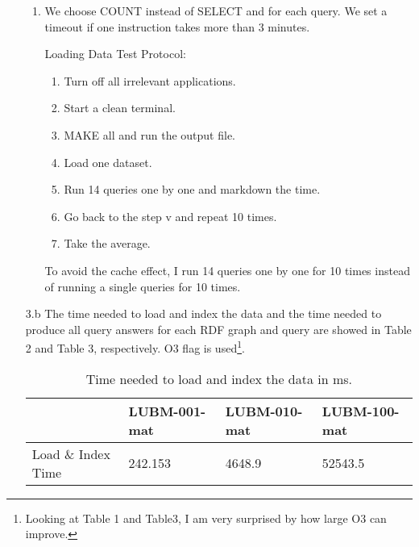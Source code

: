 \documentclass{article}
\begin{document}
\begin{enumerate}
\begin{enumerate}
\item 
We choose COUNT instead of SELECT and for each query. We set a timeout if one instruction takes more than 3 minutes. 


Loading Data Test Protocol:

\begin{enumerate}
\item Turn off all irrelevant applications.
\item Start a clean terminal.
\item MAKE all and run the output file.
\item Load one dataset. 
\item Run 14 queries one by one and markdown the time. 
\item Go back to the step v and  repeat 10 times. 
\item Take the average. 
\end{enumerate}

To avoid the cache effect, I run 14 queries one by one for 10 times instead of running a single queries for 10 times.

\end{enumerate}

\item[3.b] The time needed to load and index the data and the time needed to produce all query answers for each RDF graph and query are showed in Table 2 and Table 3, respectively. O3 flag is used\footnote{Looking at Table 1 and Table3, I am very surprised by how large O3 can improve.}.

\begin{table}[H]\centering
\begin{tabular}{|l|l|l|l|}
\hline
                   & LUBM-001-mat & LUBM-010-mat & LUBM-100-mat \\ \hline
Load \& Index Time & 242.153         & 4648.9        & 52543.5       \\ \hline
\end{tabular}
\caption{Time needed to load and index the data in ms.}
\end{table}




\end{enumerate}
\end{document}
